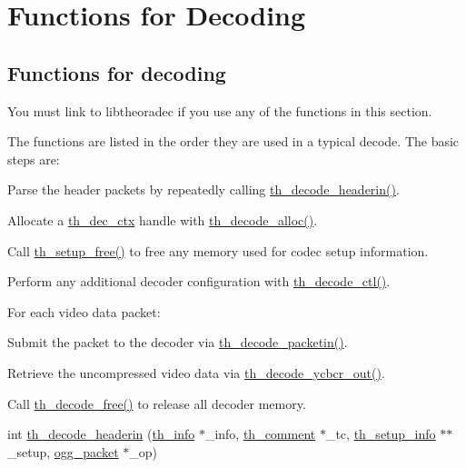 \hypertarget{group__decfuncs}{}\section{Functions for Decoding}
\label{group__decfuncs}
\subsection*{Functions for decoding}
\label{_amgrp9d29c94aa62f20426aa5ff062c7daedd}%
You must link to {\ttfamily libtheoradec} if you use any of the functions in this section.

The functions are listed in the order they are used in a typical decode. The basic steps are\+:
\begin{DoxyItemize}
\item Parse the header packets by repeatedly calling \hyperlink{group__decfuncs_ga006d01d36fbe64768c571e6a12b7fc50}{th\+\_\+decode\+\_\+headerin()}.
\item Allocate a \hyperlink{theoradec_8h_a843d70bb02563885a8d54b9c1a781729}{th\+\_\+dec\+\_\+ctx} handle with \hyperlink{group__decfuncs_ga0ef07a9a97849054aa606c595a2d807e}{th\+\_\+decode\+\_\+alloc()}.
\item Call \hyperlink{group__decfuncs_gadef55431b68aaa59d0d7b32b2f118f27}{th\+\_\+setup\+\_\+free()} to free any memory used for codec setup information.
\item Perform any additional decoder configuration with \hyperlink{group__decfuncs_ga1a8051958d75b1012573b6e3c8f670e1}{th\+\_\+decode\+\_\+ctl()}.
\item For each video data packet\+:
\begin{DoxyItemize}
\item Submit the packet to the decoder via \hyperlink{group__decfuncs_ga31c814bf09b2232aff69c57ae20f04eb}{th\+\_\+decode\+\_\+packetin()}.
\item Retrieve the uncompressed video data via \hyperlink{group__decfuncs_gaa9cc8af63fa8540e0fc95572f259cdcb}{th\+\_\+decode\+\_\+ycbcr\+\_\+out()}.
\end{DoxyItemize}
\item Call \hyperlink{group__decfuncs_gafb6684ad8ba507b71112bc9de148e7d0}{th\+\_\+decode\+\_\+free()} to release all decoder memory. 
\end{DoxyItemize}\begin{DoxyCompactItemize}
\item 
int \hyperlink{group__decfuncs_ga006d01d36fbe64768c571e6a12b7fc50}{th\+\_\+decode\+\_\+headerin} (\hyperlink{structth__info}{th\+\_\+info} $\ast$\+\_\+info, \hyperlink{structth__comment}{th\+\_\+comment} $\ast$\+\_\+tc, \hyperlink{theoradec_8h_ab71cd2657455cc27d6c0127c66a89f28}{th\+\_\+setup\+\_\+info} $\ast$$\ast$\+\_\+setup, \hyperlink{structogg__packet}{ogg\+\_\+packet} $\ast$\+\_\+op)
$$
\end{DoxyCompactItemize}
